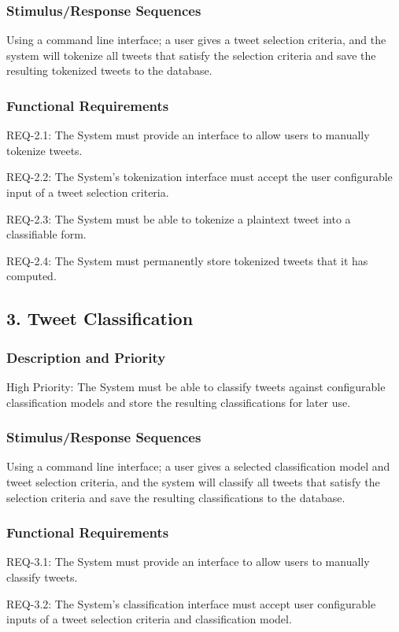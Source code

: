 \documentclass[11pt]{report}
\begin{document}
\subsubsection*{Stimulus/Response Sequences}
Using a command line interface; a user gives a tweet selection criteria, and the system will tokenize all tweets that satisfy the selection criteria and save the resulting tokenized tweets to the database.
\subsubsection*{Functional Requirements}
REQ-2.1: The System must provide an interface to allow users to manually tokenize tweets.

REQ-2.2: The System’s tokenization interface must accept the user configurable input of a tweet selection criteria.

REQ-2.3: The System must be able to tokenize a plaintext tweet into a classifiable form.

REQ-2.4: The System must permanently store tokenized tweets that it has computed.
	
\subsection*{3. Tweet Classification}
\subsubsection*{Description and Priority}
High Priority: The System must be able to classify tweets against configurable classification models and store the resulting classifications for later use.
\subsubsection*{Stimulus/Response Sequences}
Using a command line interface; a user gives a selected classification model and tweet selection criteria, and the system will classify all tweets that satisfy the selection criteria and save the resulting classifications to the database.
\subsubsection*{Functional Requirements}
REQ-3.1: The System must provide an interface to allow users to manually classify tweets.

REQ-3.2: The System’s classification interface must accept user configurable inputs of a tweet selection criteria and classification model.
\end{document}
